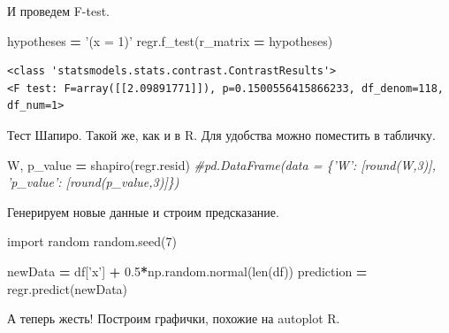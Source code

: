 \documentclass[]{book}
\newenvironment{Shaded}{\begin{snugshade}}{\end{snugshade}}
\newcommand{\BuiltInTok}[1]{#1}
\newcommand{\CommentTok}[1]{\textcolor[rgb]{0.56,0.35,0.01}{\textit{#1}}}
\newcommand{\DecValTok}[1]{\textcolor[rgb]{0.00,0.00,0.81}{#1}}
\newcommand{\FloatTok}[1]{\textcolor[rgb]{0.00,0.00,0.81}{#1}}
\newcommand{\ImportTok}[1]{#1}
\newcommand{\NormalTok}[1]{#1}
\newcommand{\OperatorTok}[1]{\textcolor[rgb]{0.81,0.36,0.00}{\textbf{#1}}}
\newcommand{\StringTok}[1]{\textcolor[rgb]{0.31,0.60,0.02}{#1}}
\begin{document}
И проведем F-test.

\begin{Shaded}
\begin{Highlighting}[]
\NormalTok{hypotheses }\OperatorTok{=} \StringTok{'(x = 1)'}
\NormalTok{regr.f_test(r_matrix }\OperatorTok{=}\NormalTok{ hypotheses)}
\end{Highlighting}
\end{Shaded}

\begin{verbatim}
<class 'statsmodels.stats.contrast.ContrastResults'>
<F test: F=array([[2.09891771]]), p=0.1500556415866233, df_denom=118, df_num=1>
\end{verbatim}

Тест Шапиро. Такой же, как и в R. Для удобства можно поместить в табличку.

\begin{Shaded}
\begin{Highlighting}[]
\NormalTok{W, p_value }\OperatorTok{=}\NormalTok{ shapiro(regr.resid)}
\CommentTok{#pd.DataFrame(data = \{'W': [round(W,3)], 'p_value': [round(p_value,3)]\})}
\end{Highlighting}
\end{Shaded}

Генерируем новые данные и строим предсказание.

\begin{Shaded}
\begin{Highlighting}[]
\ImportTok{import}\NormalTok{ random}
\NormalTok{random.seed(}\DecValTok{7}\NormalTok{)}

\NormalTok{newData }\OperatorTok{=}\NormalTok{ df[}\StringTok{'x'}\NormalTok{] }\OperatorTok{+} \FloatTok{0.5}\OperatorTok{*}\NormalTok{np.random.normal(}\BuiltInTok{len}\NormalTok{(df))}
\NormalTok{prediction }\OperatorTok{=}\NormalTok{ regr.predict(newData)}
\end{Highlighting}
\end{Shaded}

А теперь жесть! Построим графички, похожие на autoplot R.
\end{document}
